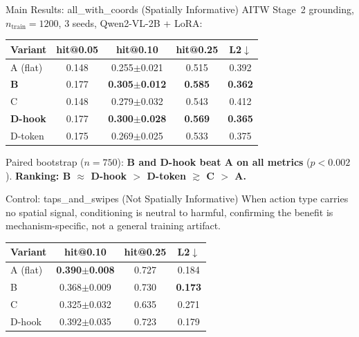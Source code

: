 \documentclass[final]{beamer}
\newlength{\colwidth}
\begin{document}
\begin{frame}[t]
\begin{columns}[t]
\begin{column}{\colwidth}
  \begin{alertblock}{Main Results: all\_with\_coords (Spatially Informative)}
    \vspace{0.4em}
    AITW Stage~2 grounding, $n_{\text{train}}=1200$, 3 seeds, Qwen2-VL-2B + LoRA:

    \renewcommand{\arraystretch}{1.22}
    \begin{tabular}{@{}lcccc@{}}
      \toprule
      \textbf{Variant} & \textbf{hit@0.05} & \textbf{hit@0.10} & \textbf{hit@0.25} & \textbf{L2$\downarrow$} \\
      \midrule
      A (flat)        & 0.148 & 0.255$\pm$0.021 & 0.515 & 0.392 \\
      \textbf{B}      & 0.177 & \textbf{0.305$\pm$0.012} & \textbf{0.585} & \textbf{0.362} \\
      C               & 0.148 & 0.279$\pm$0.032 & 0.543 & 0.412 \\
      \textbf{D-hook} & 0.177 & \textbf{0.300$\pm$0.028} & \textbf{0.569} & \textbf{0.365} \\
      D-token         & 0.175 & 0.269$\pm$0.025 & 0.533 & 0.375 \\
      \bottomrule
    \end{tabular}

    Paired bootstrap ($n{=}750$): \textbf{B and D-hook beat A on all metrics} ($p{<}0.002$). \textbf{Ranking: B $\approx$ D-hook $>$ D-token $\gtrsim$ C $>$ A.}
  \end{alertblock}

  \begin{block}{Control: taps\_and\_swipes (Not Spatially Informative)}
    When action type carries no spatial signal, conditioning is neutral to harmful, confirming the benefit is mechanism-specific, not a general training artifact.

    \begin{tabular}{@{}lccc@{}}
      \toprule
      \textbf{Variant} & \textbf{hit@0.10} & \textbf{hit@0.25} & \textbf{L2$\downarrow$} \\
      \midrule
      A (flat)   & \textbf{0.390$\pm$0.008} & 0.727 & 0.184 \\
      B          & 0.368$\pm$0.009 & 0.730 & \textbf{0.173} \\
      C          & 0.325$\pm$0.032 & 0.635 & 0.271 \\
      D-hook     & 0.392$\pm$0.035 & 0.723 & 0.179 \\
      \bottomrule
    \end{tabular}
  \end{block}


\end{column}
\end{columns}
\end{frame}
\end{document}
